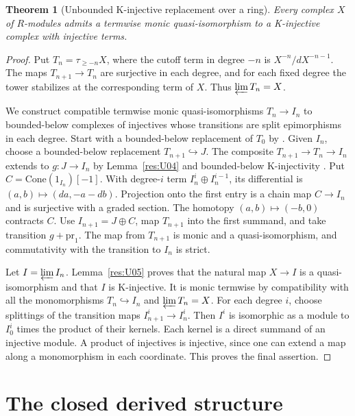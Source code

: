 \documentclass[11pt,oneside,openany]{book}
\newtheorem{theorem}{Theorem}[chapter]
\theoremstyle{definition}
\theoremstyle{remark}
\begin{document}
\begin{theorem}[Unbounded K-injective replacement over a ring]\label{res:U06}
Every complex \(X\) of \(R\)-modules admits a termwise monic
quasi-isomorphism to a K-injective complex with injective terms.
\end{theorem}
\begin{proof}
Put \(T_n=\tau_{\geq -n}X\), where the cutoff term in degree
\(-n\) is \(X^{-n}/d X^{-n-1}\). The maps
\(T_{n+1}\to T_n\) are surjective in each degree, and for
each fixed degree the tower stabilizes at the corresponding
term of \(X\). Thus \(\varprojlim T_n=X\).

We construct compatible termwise monic quasi-isomorphisms
\(T_n\to I_n\) to bounded-below complexes of injectives
whose transitions are split epimorphisms in each degree.
Start with a bounded-below replacement of \(T_0\) by
\cite[R01]{ha-core}. Given \(I_n\), choose a bounded-below
replacement \(T_{n+1}\hookrightarrow J\).
The composite \(T_{n+1}\to T_n\to I_n\) extends to \(g:J\to I_n\)
by Lemma~\ref{res:U04} and bounded-below K-injectivity
\cite[R03]{ha-core}. Put \(C=\mathrm{Cone}(1_{I_n})[-1]\).
With degree-\(i\) term \(I_n^i\oplus I_n^{i-1}\), its differential is
\((a,b)\mapsto(d a,-a-d b)\). Projection onto the first entry is a
chain map \(C\to I_n\) and is surjective with a graded section.
The homotopy \((a,b)\mapsto(-b,0)\) contracts \(C\).
Use \(I_{n+1}=J\oplus C\), map \(T_{n+1}\) into the first summand,
and take transition \(g+\mathrm{pr}_1\).
The map from \(T_{n+1}\) is monic and a quasi-isomorphism,
and commutativity with the transition to \(I_n\) is strict.

Let \(I=\varprojlim I_n\).
Lemma~\ref{res:U05} proves that the natural map \(X\to I\)
is a quasi-isomorphism and that \(I\) is K-injective.
It is monic termwise by compatibility with all the monomorphisms
\(T_n\hookrightarrow I_n\) and \(\varprojlim T_n=X\).
For each degree \(i\), choose splittings of the transition maps
\(I_{n+1}^i\to I_n^i\). Then \(I^i\) is isomorphic as a module to
\(I_0^i\) times the product of their kernels. Each kernel is a direct
summand of an injective module. A product of injectives is injective,
since one can extend a map along a monomorphism in each coordinate.
This proves the final assertion.
\end{proof}

\section{The closed derived structure}
\end{document}
